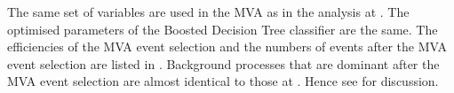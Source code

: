 The same set of variables are used in the MVA as in the analysis at . The optimised parameters of the Boosted Decision Tree classifier are the same. The efficiencies of the MVA event selection and the numbers of events after the MVA event selection are listed in . Background processes that are dominant after the MVA event selection are almost identical to those at . Hence see  for discussion.

